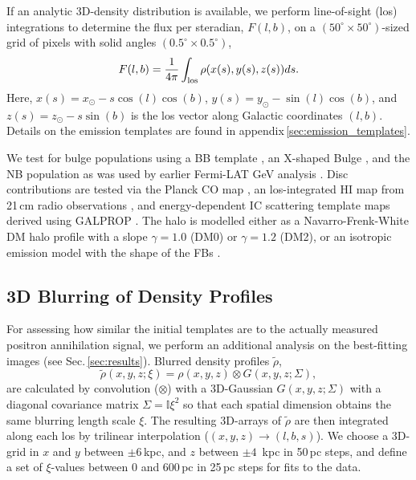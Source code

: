 \documentclass[doublespace,nopageskip]{VTthesis} %
\begin{document}
	
	If an analytic 3D-density distribution is available, we perform line-of-sight (los) integrations to determine the flux per steradian, $F(l,b)$, on a $(50^{\circ} \times 50^{\circ})$-sized grid of pixels with solid angles $(0.5^{\circ} \times 0.5^{\circ})$,
	\begin{equation}
		F(l,b) = \frac{1}{4\pi} \int_{\rm los} \rho(x(s),y(s),z(s)) ds\mathrm{.}
		\label{eq:los_integral}
	\end{equation}
	\noindent Here, $x(s) = x_{\odot} - s \cos(l) \cos(b)$, $y(s) = y_{\odot} - \sin(l) \cos(b)$, and $z(s) = z_{\odot} - s \sin(b)$ is the los vector along Galactic coordinates $(l,b)$.
	Details on the emission templates are found in appendix\,\ref{sec:emission_templates}.
	
	
	We test for bulge populations using a BB template \citep{Freudenreich1998_BoxyBulge_COBE}, an X-shaped Bulge \citep[XB;][]{Ness2016_Xbulge_WISE}, and the NB \citep{Launhardt2002_NB} population as was used by earlier Fermi-LAT GeV analysis \cite[e.g.,][]{Macias2018_LATGeV,Bartels2018_GeVexcess_stars}.
	Disc contributions are tested via the Planck CO map \citep{Planck2016_foregrounds}, an los-integrated HI map from 21\,cm radio observations \citep{Dickey1990_HI}, and  energy-dependent IC scattering template maps derived using GALPROP  \citep{Strong2007_GALPROP}.
	The halo is modelled either as a Navarro-Frenk-White \citep{Navarro1997_NFW} DM halo profile with a slope $\gamma = 1.0$ (DM0) or $\gamma=1.2$ (DM2), or an isotropic emission model with the shape of the FBs \citep{Su2010_fermibubbles}.
	
	
	\subsection{3D Blurring of Density Profiles}\label{sec:blurring_maps}
	For assessing how similar the initial templates are to the actually measured positron annihilation signal, we perform an additional analysis on the best-fitting images (see Sec.\,\ref{sec:results}).
	Blurred density profiles $\tilde{\rho}$,
	\begin{equation}
		\tilde{\rho}(x,y,z;\xi) = \rho(x,y,z) \otimes G(x,y,z;\Sigma)\mathrm{,} 
		\label{eq:3Dblurring}
	\end{equation}
	\noindent are calculated by convolution ($\otimes$) with a 3D-Gaussian  $G(x,y,z;\Sigma)$ with a diagonal covariance matrix $\Sigma = \mathbb{I}\xi^2$ so that each spatial dimension obtains the same blurring length scale $\xi$.
	The resulting 3D-arrays of $\tilde{\rho}$ are then integrated along each los by trilinear interpolation ($(x,y,z) \rightarrow (l,b,s)$).
	We choose a 3D-grid in $x$ and $y$ between $\pm 6$\,kpc, and $z$ between $\pm 4$\, kpc in 50\,pc steps, and define a set of $\xi$-values between 0 and 600\,pc in 25\,pc steps for fits to the data.
	
\end{document}
